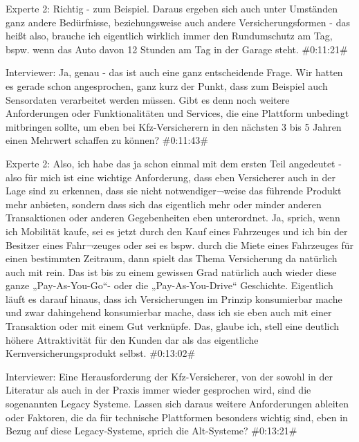 Experte 2:
Richtig - zum Beispiel. Daraus ergeben sich auch unter Umständen ganz andere Bedürfnisse, beziehungsweise auch andere Versicherungsformen - das heißt also, brauche ich eigentlich wirklich immer den Rundumschutz am Tag, bspw. wenn das Auto davon 12 Stunden am Tag in der Garage steht.
\#0:11:21\#

Interviewer:
Ja, genau - das ist auch eine ganz entscheidende Frage. Wir hatten es gerade schon angesprochen, ganz kurz der Punkt, dass zum Beispiel auch Sensordaten verarbeitet werden müssen. Gibt es denn noch weitere Anforderungen oder Funktionalitäten und Services, die eine Plattform unbedingt mitbringen sollte, um eben bei Kfz-Versicherern in den nächsten 3 bis 5 Jahren einen Mehrwert schaffen zu können?
\#0:11:43\#

Experte 2:
Also, ich habe das ja schon einmal mit dem ersten Teil angedeutet - also für mich ist eine wichtige Anforderung, dass eben Versicherer auch in der Lage sind zu erkennen, dass sie nicht notwendiger¬weise das führende Produkt mehr anbieten, sondern dass sich das eigentlich mehr oder minder anderen Transaktionen oder anderen Gegebenheiten eben unterordnet. Ja, sprich, wenn ich Mobilität kaufe, sei es jetzt durch den Kauf eines Fahrzeuges und ich bin der Besitzer eines Fahr¬zeuges oder sei es bspw. durch die Miete eines Fahrzeuges für einen bestimmten Zeitraum, dann spielt das Thema Versicherung da natürlich auch mit rein. Das ist bis zu einem gewissen Grad natürlich auch wieder diese ganze „Pay-As-You-Go“- oder die „Pay-As-You-Drive“ Geschichte. Eigentlich läuft es darauf hinaus, dass ich Versicherungen im Prinzip konsumierbar mache und zwar dahingehend konsumierbar mache, dass ich sie eben auch mit einer Transaktion oder mit einem Gut verknüpfe. Das, glaube ich, stell eine deutlich höhere Attraktivität für den Kunden dar als das eigentliche Kernversicherungsprodukt selbst.
\#0:13:02\#

Interviewer:
Eine Herausforderung der Kfz-Versicherer, von der sowohl in der Literatur als auch in der Praxis immer wieder gesprochen wird, sind die sogenannten Legacy Systeme. Lassen sich daraus weitere Anforderungen ableiten oder Faktoren, die da für technische Plattformen besonders wichtig sind, eben in Bezug auf diese Legacy-Systeme, sprich die Alt-Systeme?
\#0:13:21\#

